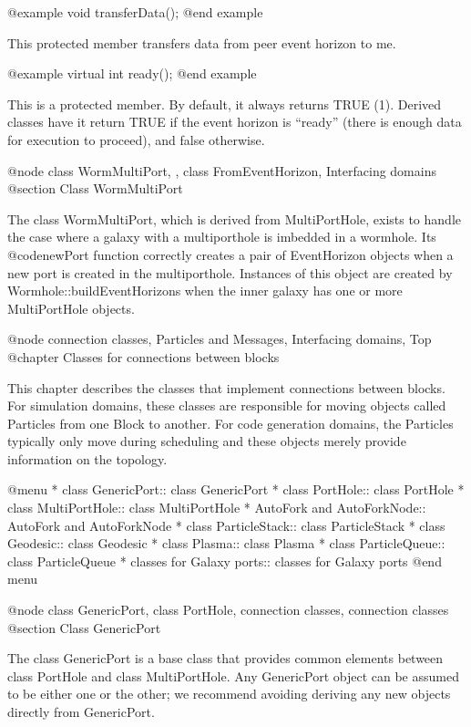 @example
void transferData();
@end example

This protected member transfers data from peer event horizon to me.

@example
virtual int ready();
@end example

This is a protected member.  By default, it always returns TRUE (1).
Derived classes have it return TRUE if the event horizon is ``ready''
(there is enough data for execution to proceed), and false otherwise.

@node class WormMultiPort,  , class FromEventHorizon, Interfacing domains
@section Class WormMultiPort

The class WormMultiPort, which is derived from MultiPortHole, exists to
handle the case where a galaxy with a multiporthole is imbedded in a
wormhole.  Its @code{newPort} function correctly creates a pair of
EventHorizon objects when a new port is created in the multiporthole.
Instances of this object are created by Wormhole::buildEventHorizons
when the inner galaxy has one or more MultiPortHole objects.

@node connection classes, Particles and Messages, Interfacing domains, Top
@chapter Classes for connections between blocks

This chapter describes the classes that implement connections between
blocks.  For simulation domains, these classes are responsible for
moving objects called Particles from one Block to another.  For code
generation domains, the Particles typically only move during scheduling
and these objects merely provide information on the topology.

@menu
* class GenericPort::           class GenericPort
* class PortHole::              class PortHole
* class MultiPortHole::         class MultiPortHole
* AutoFork and AutoForkNode::   AutoFork and AutoForkNode
* class ParticleStack::         class ParticleStack
* class Geodesic::              class Geodesic
* class Plasma::                class Plasma
* class ParticleQueue::         class ParticleQueue
* classes for Galaxy ports::    classes for Galaxy ports
@end menu

@node class GenericPort, class PortHole, connection classes, connection classes
@section Class GenericPort

The class GenericPort is a base class that provides common elements
between class PortHole and class MultiPortHole.  Any GenericPort object
can be assumed to be either one or the other; we recommend avoiding
deriving any new objects directly from GenericPort.

